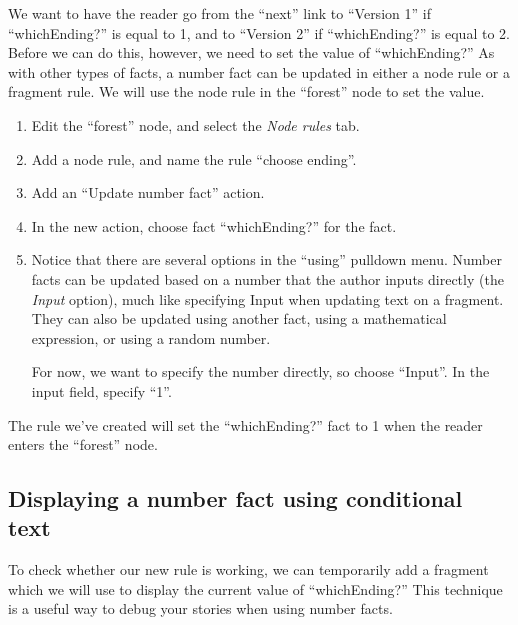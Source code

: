 \documentclass{article}
\begin{document}
We want to have the reader go from the ``next'' link to ``Version 1'' 
if ``whichEnding?'' is equal to 1, and to ``Version 2'' if 
``whichEnding?'' is equal to 2. Before we can do this, however, we 
need to set the value of ``whichEnding?'' As with other types of 
facts, a number fact can be updated in either a node rule or a fragment 
rule. We will use the node rule in the ``forest'' node to set the 
value.      

\begin{enumerate}
    \item Edit the ``forest'' node, and select the \textit{Node rules} tab.
    \item Add a node rule, and name the rule ``choose ending''.
    \item Add an ``Update number fact'' action.
    \item In the new action, choose fact ``whichEnding?'' for the fact.
    \item Notice that there are several options in the ``using'' pulldown menu. Number facts can be updated based on a number that the author inputs directly (the \textit{Input} option), much like specifying Input when updating text on a fragment. They can also be updated using another fact, using a mathematical expression, or using a random number.
    
For now, we want to specify the number directly, so choose ``Input''. In the input field, specify ``1''.
\end{enumerate}

\noindent The rule we've created will set the ``whichEnding?'' fact to 1 when the reader enters the ``forest'' node.

\subsection{Displaying a number fact using conditional text}

To check whether our new rule is working, we can temporarily add a fragment which we will use to display the current value of ``whichEnding?'' This technique is a useful way to debug your stories when using number facts.
\end{document}
